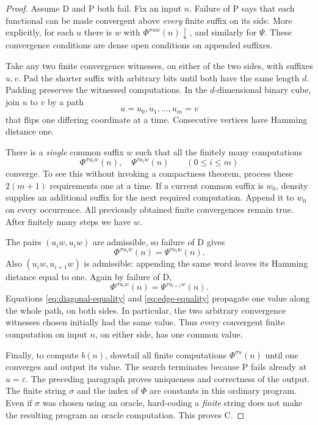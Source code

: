 \documentclass[11pt,a4paper]{article}
\newcommand{\emptystr}{\varepsilon}
\theoremstyle{definition}\newtheorem{definition}[theorem]{Definition}
\theoremstyle{remark}\newtheorem{remark}[theorem]{Remark}
\begin{document}
\begin{proof}
Assume D and P both fail. Fix an input $n$.
Failure of P says that each functional can be made convergent above
\emph{every} finite suffix on its side. More explicitly, for each $u$ there
is $w$ with $\Phi^{\sigma u w}(n)\downarrow$, and similarly for $\Psi$.
These convergence conditions are dense open conditions on appended suffixes.

Take any two finite convergence witnesses, on either of the two sides, with
suffixes $u,v$. Pad the shorter suffix with arbitrary bits until both have
the same length $d$. Padding preserves the witnessed computations.
In the $d$-dimensional binary cube, join $u$ to $v$ by a path
\[
             u=u_0,u_1,\ldots,u_m=v
\]
that flips one differing coordinate at a time. Consecutive vertices have
Hamming distance one.

There is a \emph{single} common suffix $w$ such that all the finitely many
computations
\begin{equation}\label{eq:simultaneous}
  \Phi^{\sigma u_iw}(n),\quad\Psi^{\tau u_iw}(n)\qquad(0\le i\le m)
\end{equation}
converge. To see this without invoking a compactness theorem, process these
$2(m+1)$ requirements one at a time. If a current common suffix is $w_0$,
density supplies an additional suffix for the next required computation.
Append it to $w_0$ on every occurrence. All previously obtained finite
convergences remain true. After finitely many steps we have $w$.

The pairs $(u_iw,u_iw)$ are admissible, so failure of D gives
\begin{equation}\label{eq:diagonal-equality}
      \Phi^{\sigma u_iw}(n)=\Psi^{\tau u_iw}(n).
\end{equation}
Also $(u_iw,u_{i+1}w)$ is admissible: appending the same word leaves its
Hamming distance equal to one. Again by failure of D,
\begin{equation}\label{eq:edge-equality}
      \Phi^{\sigma u_iw}(n)=\Psi^{\tau u_{i+1}w}(n).
\end{equation}
Equations \eqref{eq:diagonal-equality} and \eqref{eq:edge-equality} propagate
one value along the whole path, on both sides. In particular, the two
arbitrary convergence witnesses chosen initially had the same value.
Thus every convergent finite computation on input $n$, on either side, has
one common value.

Finally, to compute $b(n)$, dovetail all finite computations
$\Phi^{\sigma u}(n)$ until one converges and output its value. The search
terminates because P fails already at $u=\emptystr$. The preceding paragraph
proves uniqueness and correctness of the output. The finite string $\sigma$
and the index of $\Phi$ are constants in this ordinary program. Even if
$\sigma$ was chosen using an oracle, hard-coding a \emph{finite} string does
not make the resulting program an oracle computation. This proves C.
\end{proof}
\end{document}
